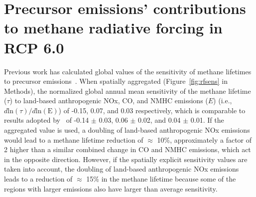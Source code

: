 \section{Precursor emissions' contributions to methane radiative forcing in RCP 6.0}

Previous work has calculated global values of the sensitivity of methane lifetimes to precursor emissions~\citep{ref:fry2012,ref:holmes2013}. When spatially aggregated (Figure~\ref{fig:rfsens} in Methods), the normalized global annual mean sensitivity of the methane lifetime ($\tau$)  to land-based anthropogenic NOx, CO, and NMHC emissions ($E$) (i.e., $d \mathrm{ln}(\tau)/d\mathrm{ln}(\mathrm{E})$) of -0.15, 0.07, and 0.03 respectively, which is comparable to results adopted by~\citet{ref:holmes2013} of -0.14 $\pm$ 0.03, 0.06 $\pm$ 0.02, and 0.04 $\pm$ 0.01. If the aggregated value is used, a doubling of land-based anthropogenic NOx emissions would lead to a methane lifetime reduction of $\approx$ 10\%, approximately a factor of 2 higher than a similar combined change in CO and NMHC emissions, which act in the opposite direction. However, if the spatially explicit sensitivity values are taken into account, the doubling of land-based anthropogenic NOx emissions leads to a reduction of $\approx$ 15\% in the methane lifetime because some of the regions with larger emissions also have larger than average sensitivity.


